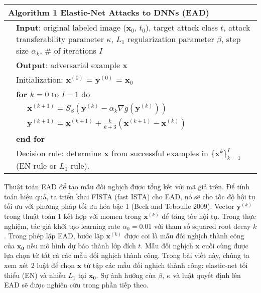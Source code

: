\begin{center}
	\begin{tabular}{lll}
		\hline 
		\multicolumn{3}{l}{\textbf{Algorithm 1} Elastic-Net Attacks to DNNs (EAD)} \\
		\hline 
		& \multicolumn{2}{p{14cm}}{\textbf{Input}: original labeled image ($\mathbf{x}_0$, $t_0$), target attack class $t$, attack transferability parameter $\kappa$, $L_1$ regularization parameter $\beta$, step size $\alpha_k$, \# of iterations $I$} \\
		& \multicolumn{2}{l}{\textbf{Output}: adversarial example $\mathbf{x}$} \\
		& \multicolumn{2}{l}{Initialization: $\mathbf{x}^{(0)}$ = $\mathbf{y}^{(0)}$ = $\mathbf{x}_0$} \\
		& \multicolumn{2}{l}{\textbf{for} $k = 0$ to $I - 1$ do} \\
		&& $\mathbf{x}^{(k+1)} = S_{\beta}(\mathbf{y}^{(k)} -\alpha_{k} \nabla g(\mathbf{y}^{(k)}))$ \\
		&& $\mathbf{y}^{(k+1)} = \mathbf{x}^{(k+1)} + \frac{k}{k+3} (\mathbf{x}^{(k+1)} - \mathbf{x}^{(k)}) $ \\
		& \multicolumn{2}{l}{\textbf{end for}} \\
		& \multicolumn{2}{p{14cm}}{Decision rule: determine $\mathbf{x}$ from successful examples in $\{\mathbf{x}^k\}_{k=1}^{I}$ (EN rule or $L_1$ rule).}\\
		\hline
	\end{tabular}
	\label{arg:ag_1}
\end{center}

Thuật toán EAD để tạo mẫu đối nghịch được tổng kết với mã giả trên. Để tính toán hiệu quả,
 ta triển khai FISTA (fast ISTA) cho EAD, nó sẽ cho tốc độ hội tụ tối ưu với phương pháp 
 tối ưu hóa bậc 1 (Beck and Teboulle 2009). Vector $\mathbf{y}^{(k)}$ trong thuật toán 1 
 kết hợp với momen trong $\mathbf{x}^{(k)}$ để tăng tốc hội tụ. Trong thực nghiệm, tác giả khởi tạo learning rate $\alpha_0 = 0.01$ với tham số squared root decay $k$. Trong phép lặp EAD, bước lặp $\mathbf{x}^{(k)}$ 
 được coi là mẫu đối nghịch thành công của $\mathbf{x_0}$ nếu mô hình dự báo thành lớp 
 đích $t$. Mẫu đối nghịch $\mathbf{x}$ cuối cùng được lựa chọn từ tất cả các mẫu đối nghịch 
 thành công. Trong bài viết này, chúng ta xem xét 2 luật để chọn $\mathbf{x}$ từ tập các 
 mẫu đối nghịch thành công: elastic-net tối thiểu (EN) và nhiễu $L_1$ tại $\mathbf{x_0}$.
Sự ảnh hưởng của $\beta$, $\kappa$  và luật quyết định lên EAD sẽ được nghiên cứu trong phần tiếp theo.
